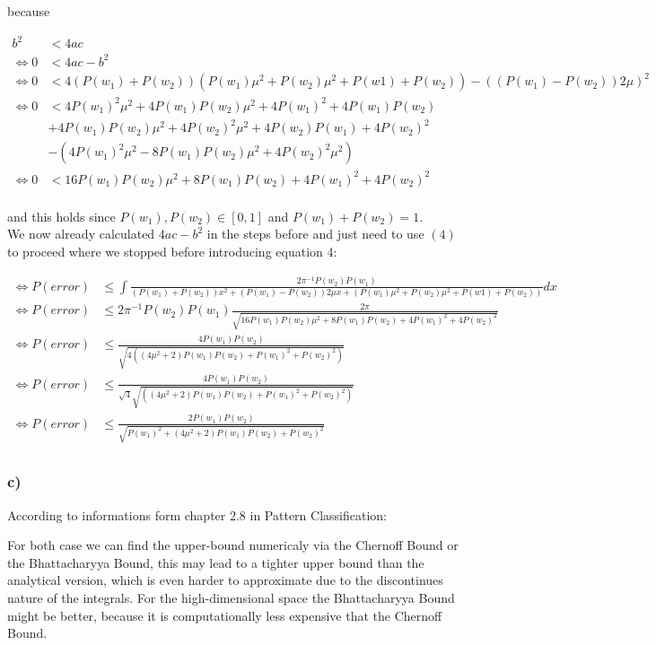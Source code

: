 \documentclass[10pt,a4paper]{article}
\begin{document}
because

\begin{align*}
    b^2 &< 4ac \\
    \Leftrightarrow 0 &< 4ac-b^2 \\
    \Leftrightarrow 0 &< 4(P(w_1)+P(w_2))(P(w_1)\mu^2 + P(w_2)\mu^2+P(w1)+P(w_2))-((P(w_1)-P(w_2))2\mu)^2 \\
    \Leftrightarrow 0 &< 4P(w_1)^2\mu^2 + 4P(w_1)P(w_2)\mu^2+4P(w_1)^2+4P(w_1)P(w_2) \\
    &+ 4P(w_1)P(w_2)\mu^2+4P(w_2)^2\mu^2+ 4P(w_2)P(w_1)+4P(w_2)^2 \\
    &- (4P(w_1)^2\mu^2-8P(w_1)P(w_2)\mu^2+4P(w_2)^2\mu^2) \\
    \Leftrightarrow 0 &< 16P(w_1)P(w_2)\mu^2+8P(w_1)P(w_2)+4P(w_1)^2+4P(w_2)^2 \\
\end{align*}

and this holds since $P(w_1), P(w_2) \in [0,1]$ and $P(w_1) + P(w_2) = 1$.\\
We now already calculated $4ac-b^2$ in the steps before and just need to use $(4)$ to proceed where we stopped before introducing equation 4:

\begin{align*}
    \Leftrightarrow P(error) &\le \int \frac{2 \pi^{-1} P(w_2) P(w_1)}{(P(w_1)+P(w_2))x^2 + (P(w_1)-P(w_2))2\mu x + (P(w_1)\mu^2 + P(w_2)\mu^2+P(w1)+P(w_2))}dx \\
    \Leftrightarrow P(error) &\le 2 \pi^{-1} P(w_2) P(w_1) \frac{2\pi}{\sqrt{16P(w_1)P(w_2)\mu^2+8P(w_1)P(w_2)+4P(w_1)^2+4P(w_2)^2}} \\
    \Leftrightarrow P(error) &\le \frac{4 P(w_1) P(w_2) }{\sqrt{4((4\mu^2+2)P(w_1)P(w_2)+P(w_1)^2+P(w_2)^2)}} \\
    \Leftrightarrow P(error) &\le \frac{4 P(w_1) P(w_2) }{\sqrt{4}\sqrt{((4\mu^2+2)P(w_1)P(w_2)+P(w_1)^2+P(w_2)^2)}} \\
    \Leftrightarrow P(error) &\le \frac{2 P(w_1) P(w_2) }{\sqrt{P(w_1)^2+(4\mu^2+2)P(w_1)P(w_2)+P(w_2)^2}} \\
\end{align*}

\subsubsection*{c)}
According to informations form chapter 2.8 in Pattern Classification:

For both case we can find the upper-bound numericaly via the Chernoff Bound or the Bhattacharyya Bound, this may lead to a tighter upper bound than the analytical version, which is even harder to approximate due to the discontinues nature of the integrals. For the high-dimensional space the Bhattacharyya Bound might be better, because it is computationally less expensive that the Chernoff Bound.
\end{document}
